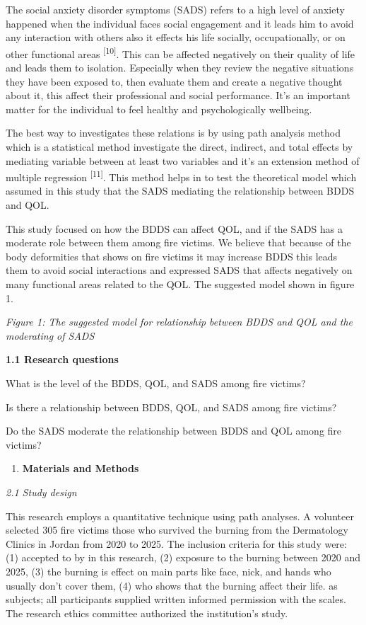 \documentclass[
]{article}
\begin{document}
The social anxiety disorder symptoms (SADS) refers to a high level of
anxiety happened when the individual faces social engagement and it
leads him to avoid any interaction with others also it effects his life
socially, occupationally, or on other functional areas
\textsuperscript{{[}10{]}}. This can be affected negatively on their
quality of life and leads them to isolation. Especially when they review
the negative situations they have been exposed to, then evaluate them
and create a negative thought about it, this affect their professional
and social performance. It's an important matter for the individual to
feel healthy and psychologically wellbeing.

The best way to investigates these relations is by using path analysis
method which is a statistical method investigate the direct, indirect,
and total effects by mediating variable between at least two variables
and it's an extension method of multiple regression
\textsuperscript{{[}11{]}}. This method helps in to test the theoretical
model which assumed in this study that the SADS mediating the
relationship between BDDS and QOL.

This study focused on how the BDDS can affect QOL, and if the SADS has a
moderate role between them among fire victims. We believe that because
of the body deformities that shows on fire victims it may increase BDDS
this leads them to avoid social interactions and expressed SADS that
affects negatively on many functional areas related to the QOL. The
suggested model shown in figure 1.

\emph{Figure 1: The suggested model for relationship between BDDS and
QOL and the moderating of SADS}

\textbf{1.1 Research questions}

What is the level of the BDDS, QOL, and SADS among fire victims?

Is there a relationship between BDDS, QOL, and SADS among fire victims?

Do the SADS moderate the relationship between BDDS and QOL among fire
victims?

\textbf{\hfill\break
}

\begin{enumerate}
\def\labelenumi{\arabic{enumi}.}
\setcounter{enumi}{1}
\item
  \textbf{Materials and Methods}
\end{enumerate}

\emph{2.1 Study design}

This research employs a quantitative technique using path analyses. A
volunteer selected 305 fire victims those who survived the burning from
the Dermatology Clinics in Jordan from 2020 to 2025. The inclusion
criteria for this study were: (1) accepted to by in this research, (2)
exposure to the burning between 2020 and 2025, (3) the burning is effect
on main parts like face, nick, and hands who usually don't cover them,
(4) who shows that the burning affect their life. as subjects; all
participants supplied written informed permission with the scales. The
research ethics committee authorized the institution's study.
\end{document}
